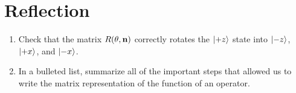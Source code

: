 \documentclass{article}
\begin{document}
\section{Reflection}
    \begin{enumerate}[label=(\alph*)]
      \item Check that the matrix $R(\theta,\vb{n})$ correctly rotates the $\ket{+z}$ state into $\ket{-z}$, $\ket{+x}$, and $\ket{-x}$.
      \vspace{6cm}
      \item In a bulleted list, summarize all of the important steps that allowed us to write the matrix representation of the function of an operator.
  \end{enumerate}
\end{document}
